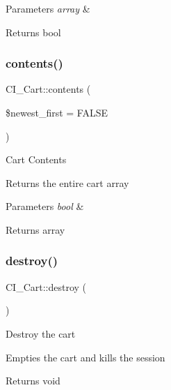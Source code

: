 \begin{DoxyParams}{Parameters}
{\em array} & \\
\hline
\end{DoxyParams}
\begin{DoxyReturn}{Returns}
bool 
\end{DoxyReturn}
\mbox{\label{class_c_i___cart_a7e15dcb9b66da6fbaf7298d47b2cd579}} 
\subsubsection{\texorpdfstring{contents()}{contents()}}
{\footnotesize\ttfamily C\+I\+\_\+\+Cart\+::contents (\begin{DoxyParamCaption}\item[{}]{\$newest\+\_\+first = {\ttfamily FALSE} }\end{DoxyParamCaption})}

Cart Contents

Returns the entire cart array


\begin{DoxyParams}{Parameters}
{\em bool} & \\
\hline
\end{DoxyParams}
\begin{DoxyReturn}{Returns}
array 
\end{DoxyReturn}
\mbox{\label{class_c_i___cart_ae5c9fc32a2251e50bb6a3cb0529c411d}} 
\subsubsection{\texorpdfstring{destroy()}{destroy()}}
{\footnotesize\ttfamily C\+I\+\_\+\+Cart\+::destroy (\begin{DoxyParamCaption}{ }\end{DoxyParamCaption})}

Destroy the cart

Empties the cart and kills the session

\begin{DoxyReturn}{Returns}
void 
\end{DoxyReturn}
\mbox{\label{class_c_i___cart_a7a83e8d522696e8fd780a4b884f2c1ba}} 
